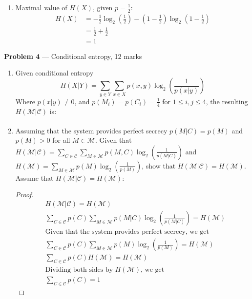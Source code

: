 \documentclass[11pt]{article}
\newcommand{\M}{\mathcal{M}}
\newcommand{\C}{\mathcal{C}}
\newcommand{\logbin}{\log_2}
\theoremstyle{definition}
\begin{document}
\begin{enumerate}
\begin{proof}
    \end{proof}
  \item
    Maximal value of $H(X)$, given $p = \frac{1}{2}$:
    \begin{equation*}
    \begin{aligned}
      H(X) &= -\frac{1}{2}\logbin (\frac{1}{2}) - (1 - \frac{1}{2})\logbin (1 - \frac{1}{2}) \\
           &= \frac{1}{2} + \frac{1}{2} \\
           &= 1
    \end{aligned}
    \end{equation*}
\end{enumerate}

\item[] \textbf{Problem 4} --- Conditional entropy, 12 marks
\begin{enumerate}
  \item
    Given conditional entropy
    \[
      H(X|Y) = \sum_{y \in Y}\sum_{x \in X}p(x, y)\logbin (\frac{1}{p(x|y)})
    \]
    Where $p(x|y) \neq 0$, and $p(M_i) = p(C_i) = \frac{1}{4}$ for $1 \leq i,j \leq 4$, the resulting $H(\M|\C)$ is:
    \begin{equation*}
    \begin{aligned}
    \end{aligned}
    \end{equation*}
  \item
    Assuming that the system provides perfect secrecy $p(M|C) = p(M)$ and $p(M) > 0$ for all $M \in \M$. Given that $H(\M|\C) = \sum_{C \in \C}\sum_{M \in \M}p(M, C)\logbin (\frac{1}{p(M|C)})$ and $H(\M) = \sum_{M \in \M}p(M)\logbin(\frac{1}{p(M)})$, show that $H(\M|\C) = H(\M)$. Assume that $H(\M|\C) = H(\M)$:
    \begin{proof}
      \begin{equation*}
      \begin{aligned}
        & H(\M|\C) = H(\M) \\
        & \sum_{C \in \C}p(C)\sum_{M \in \M}p(M|C)\logbin (\frac{1}{p(M|C)}) = H(\M) \\
        & \text{Given that the system provides perfect secrecy, we get} \\
        & \sum_{C \in \C}p(C)\sum_{M \in \M}p(M)\logbin (\frac{1}{p(M)}) = H(\M) \\
        & \sum_{C \in \C}p(C)H(\M) = H(\M) \\
        & \text{Dividing both sides by $H(\M)$, we get} \\
        & \sum_{C \in \C}p(C) = 1

\end{aligned}
\end{equation*}
\end{proof}
\end{enumerate}
\end{document}
